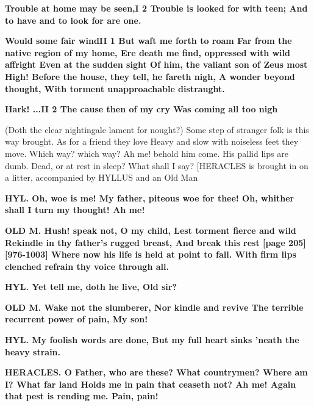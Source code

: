 \documentclass[11pt,letter]{book}
\begin{document}
\par \textbf{Trouble at home may be seen,I 2 Trouble is looked for with teen; And to have and to look for are one.}
\par 

\par \textbf{Would some fair windII 1 But waft me forth to roam Far from the native region of my home, Ere death me find, oppressed with wild affright Even at the sudden sight Of him, the valiant son of Zeus most High! Before the house, they tell, he fareth nigh, A wonder beyond thought, With torment unapproachable distraught.}
\par 

\par \textbf{Hark! ...II 2 The cause then of my cry Was coming all too nigh}
\par   (Doth the clear nightingale lament for nought?) Some step of stranger folk is this way brought. As for a friend they love Heavy and slow with noiseless feet they move. Which way? which way? Ah me! behold him come. His pallid lips are dumb. Dead, or at rest in sleep? What shall I say? [HERACLES is brought in on a litter, accompanied by HYLLUS and an Old Man

\par \textbf{HYL. Oh, woe is me! My father, piteous woe for thee! Oh, whither shall I turn my thought! Ah me!}
\par 

\par \textbf{OLD M. Hush! speak not, O my child, Lest torment fierce and wild Rekindle in thy father’s rugged breast, And break this rest [page 205][976-1003] Where now his life is held at point to fall. With firm lips clenched refrain thy voice through all.}
\par 

\par \textbf{HYL. Yet tell me, doth he live, Old sir?}
\par 

\par \textbf{OLD M. Wake not the slumberer, Nor kindle and revive The terrible recurrent power of pain, My son!}
\par 

\par \textbf{HYL. My foolish words are done, But my full heart sinks ’neath the heavy strain.}
\par 

\par \textbf{HERACLES. O Father, who are these? What countrymen? Where am I? What far land Holds me in pain that ceaseth not? Ah me! Again that pest is rending me. Pain, pain!}
\par 
\end{document}
